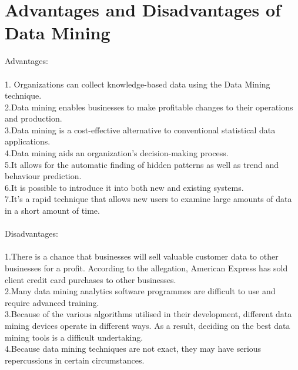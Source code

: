 \documentclass[12pt,letterpaper]{article}
\begin{document}
\section{Advantages and Disadvantages of Data Mining}
Advantages: \\
\\
1. Organizations can collect knowledge-based data using the Data Mining technique.\\
2.Data mining enables businesses to make profitable changes to their operations and production.\\
3.Data mining is a cost-effective alternative to conventional statistical data applications.\\
4.Data mining aids an organization's decision-making process.\\
5.It allows for the automatic finding of hidden patterns as well as trend and behaviour prediction.\\
6.It is possible to introduce it into both new and existing systems.\\
7.It's a rapid technique that allows new users to examine large amounts of data in a short amount of time.\\
\\

Disadvantages:\\
\\
1.There is a chance that businesses will sell valuable customer data to other businesses for a profit. According to the allegation, American Express has sold client credit card purchases to other businesses.\\
2.Many data mining analytics software programmes are difficult to use and require advanced training.\\
3.Because of the various algorithms utilised in their development, different data mining devices operate in different ways. As a result, deciding on the best data mining tools is a difficult undertaking.\\
4.Because data mining techniques are not exact, they may have serious repercussions in certain circumstances.
\end{document}
